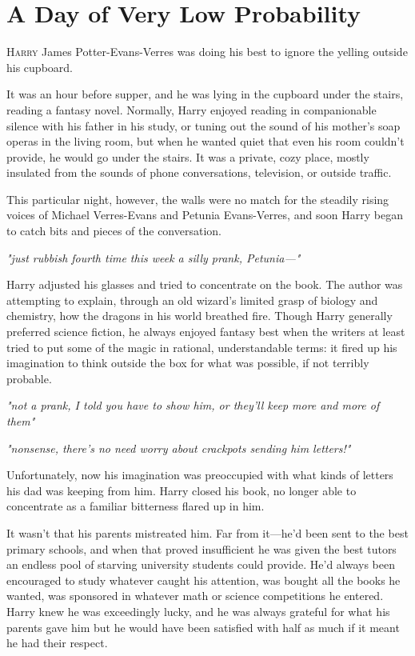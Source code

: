 
\chapter{A Day of Very Low Probability}

\lettrine{H}{arry} James Potter-Evans-Verres was doing his best to
ignore the yelling outside his cupboard.

It was an hour before supper, and he was lying in the
cupboard under the stairs, reading a fantasy novel.
Normally, Harry enjoyed reading in companionable silence with
his father in his study, or tuning out the sound of his
mother's soap operas in the living room, but when he
wanted quiet that even his room couldn't provide, he
would go under the stairs. It was a private, cozy place,
mostly insulated from the sounds of phone conversations,
television, or outside traffic.

This particular night, however, the walls were no match for
the steadily rising voices of Michael Verres-Evans and Petunia
Evans-Verres, and soon Harry began to catch bits and
pieces of the conversation.

\emph{"{\el}just rubbish{\el} fourth time this week{\el} a silly prank,
Petunia—"}

Harry adjusted his glasses and tried to concentrate on the
book. The author was attempting to explain, through an
old wizard's limited grasp of biology and chemistry, how
the dragons in his world breathed fire. Though Harry
generally preferred science fiction, he always enjoyed
fantasy best when the writers at least tried to put some
of the magic in rational, understandable terms: it fired up
his imagination to think outside the box for what was
possible, if not terribly probable.

\emph{"{\el}not a prank, I told you{\el} have to show him, or they'll
keep{\el} more and more of them{\el}"}

\emph{"{\el}nonsense, there's no need{\el} worry about crackpots
sending him letters!"}

Unfortunately, now his imagination was preoccupied with
what kinds of letters his dad was keeping from him. Harry
closed his book, no longer able to concentrate as a familiar
bitterness flared up in him.

It wasn't that his parents mistreated him. Far from it—he'd
been sent to the best primary schools, and when that
proved insufficient he was given the best tutors an endless
pool of starving university students could provide. He'd
always been encouraged to study whatever caught his
attention, was bought all the books he wanted, was
sponsored in whatever math or science competitions he
entered. Harry knew he was exceedingly lucky, and he was
always grateful for what his parents gave him{\el} but he
would have been satisfied with half as much if it meant he
had their respect.

